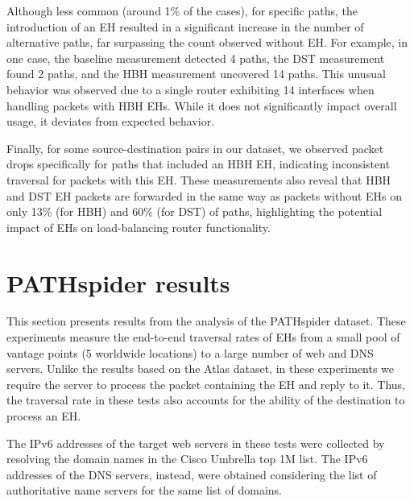 \documentclass[conference]{IEEEtran}
\begin{document}


Although less common (around 1\% of the cases), for specific paths, the introduction
of an EH resulted in a significant increase in the number of alternative paths,
far surpassing the count observed without EH.
For example, in one case, the baseline measurement detected 4 paths, the DST
measurement found 2 paths, and the HBH measurement uncovered 14 paths. This
unusual behavior was observed due to a single router exhibiting 14 interfaces
when handling packets with HBH EHs. While it does not significantly impact
overall usage, it deviates from expected behavior.

Finally, for some source-destination pairs in our dataset, we observed packet drops
specifically for paths that included an HBH EH, indicating inconsistent
traversal for packets with this EH. These measurements also reveal that HBH and DST
EH packets are forwarded in the same way as packets without EHs on only 13\%
(for HBH) and 60\% (for DST) of paths, highlighting the potential impact of EHs
on load-balancing router functionality.



 
\section{PATHspider results} 
\label{sec:pathspider-results}

This section presents results from the analysis of the PATHspider dataset.
These experiments measure the end-to-end traversal rates of EHs from a small
pool of vantage points (5 worldwide locations) to a large number of web and
DNS servers.  Unlike the results based on the Atlas dataset, in these
experiments we require the server to process the packet containing the EH and
reply to it. Thus, the traversal rate in these tests also accounts for the ability
of the destination to process an EH.

The IPv6 addresses of the target web servers in these tests were collected by
resolving the domain names in the Cisco Umbrella top 1M list. The IPv6
addresses of the DNS servers, instead, were obtained considering the list of
authoritative name servers for the same list of domains.
\end{document}
